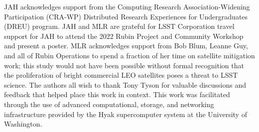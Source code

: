 \documentclass[twocolumn]{aastex631}
\begin{document}
\begin{acknowledgments}
JAH acknowledges support from the Computing Research Association-Widening Participation (CRA-WP) Distributed Research Experiences for Undergraduates (DREU) program.
JAH and MLR are grateful for LSST Corporation travel support for JAH to attend the 2022 Rubin Project and Community Workshop and present a poster.
MLR acknowledges support from Bob Blum, Leanne Guy, and all of Rubin Operations to spend a fraction of her time on satellite mitigation work; this study would not have been possible without formal recognition that the proliferation of bright commercial LEO satellites poses a threat to LSST science.
The authors all wish to thank Tony Tyson for valuable discussions and feedback that helped place this work in context.
This work was facilitated through the use of advanced computational, storage, and networking infrastructure provided by the Hyak supercomputer system at the University of Washington.
\end{acknowledgments}


{}

\end{document}
